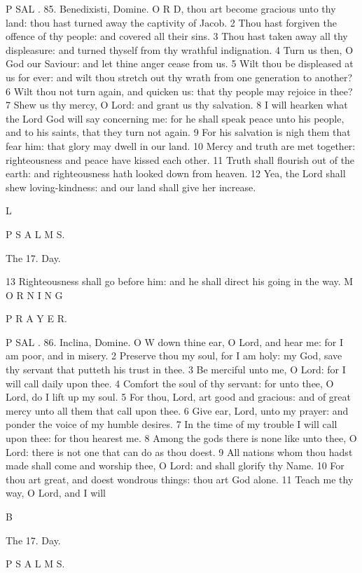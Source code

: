 P SAL . 85. Benedixisti, Domine. O R D, thou art become gracious unto thy land: thou hast turned away the captivity of Jacob. 2 Thou hast forgiven the offence of thy people: and covered all their sins. 3 Thou hast taken away all thy displeasure: and turned thyself from thy wrathful indignation. 4 Turn us then, O God our Saviour: and let thine anger cease from us. 5 Wilt thou be displeased at us for ever: and wilt thou stretch out thy wrath from one generation to another? 6 Wilt thou not turn again, and quicken us: that thy people may rejoice in thee? 7 Shew us thy mercy, O Lord: and grant us thy salvation. 8 I will hearken what the Lord God will say concerning me: for he shall speak peace unto his people, and to his saints, that they turn not again. 9 For his salvation is nigh them that fear him: that glory may dwell in our land. 10 Mercy and truth are met together: righteousness and peace have kissed each other. 11 Truth shall flourish out of the earth: and righteousness hath looked down from heaven. 12 Yea, the Lord shall shew loving-kindness: and our land shall give her increase.

L

P S A L M S.

The 17. Day.

13 Righteousness shall go before him: and he shall direct his going in the way. M O R N I N G

P R A Y E R.

P SAL . 86. Inclina, Domine. O W down thine ear, O Lord, and hear me: for I am poor, and in misery. 2 Preserve thou my soul, for I am holy: my God, save thy servant that putteth his trust in thee. 3 Be merciful unto me, O Lord: for I will call daily upon thee. 4 Comfort the soul of thy servant: for unto thee, O Lord, do I lift up my soul. 5 For thou, Lord, art good and gracious: and of great mercy unto all them that call upon thee. 6 Give ear, Lord, unto my prayer: and ponder the voice of my humble desires. 7 In the time of my trouble I will call upon thee: for thou hearest me. 8 Among the gods there is none like unto thee, O Lord: there is not one that can do as thou doest. 9 All nations whom thou hadst made shall come and worship thee, O Lord: and shall glorify thy Name. 10 For thou art great, and doest wondrous things: thou art God alone. 11 Teach me thy way, O Lord, and I will

B

The 17. Day.

P S A L M S.

